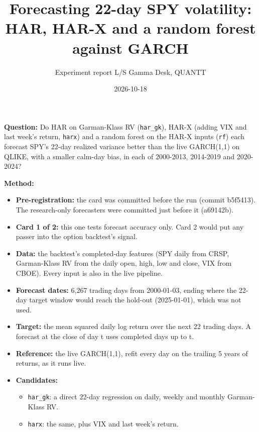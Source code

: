 \documentclass{article}
\title{Forecasting 22-day SPY volatility: HAR, HAR-X and a random forest against GARCH}
\author{Experiment report \textperiodcentered{} L/S Gamma Desk, QUANTT}
\date{2026-10-18}
\begin{document}
\maketitle

\textbf{Question:} Do HAR on Garman-Klass RV (\texttt{har\_\allowbreak{}gk}), HAR-X (adding VIX and last week's return, \texttt{harx}) and a random forest on the HAR-X inputs (\texttt{rf}) each forecast SPY's 22-day realized variance better than the live GARCH(1,1) on QLIKE, with a smaller calm-day bias, in each of 2000-2013, 2014-2019 and 2020-2024?

\textbf{Method:}

\begin{itemize}

\item \textbf{Pre-registration:} the card was committed before the run (commit b5f5413). The research-only forecasters were committed just before it (a69142b).

\item \textbf{Card 1 of 2:} this one tests forecast accuracy only. Card 2 would put any passer into the option backtest's signal.

\item \textbf{Data:} the backtest's completed-day features (SPY daily from CRSP, Garman-Klass RV from the daily open, high, low and close, VIX from CBOE). Every input is also in the live pipeline.

\item \textbf{Forecast dates:} 6,267 trading days from 2000-01-03, ending where the 22-day target window would reach the hold-out (2025-01-01), which was not used.

\item \textbf{Target:} the mean squared daily log return over the next 22 trading days. A forecast at the close of day t uses completed days up to t.

\item \textbf{Reference:} the live GARCH(1,1), refit every day on the trailing 5 years of returns, as it runs live.

\item \textbf{Candidates:}

\begin{itemize}

\item \texttt{har\_\allowbreak{}gk}: a direct 22-day regression on daily, weekly and monthly Garman-Klass RV.

\item \texttt{harx}: the same, plus VIX and last week's return.


\end{itemize}
\end{itemize}
\end{document}
